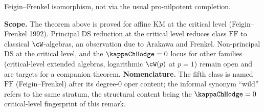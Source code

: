 \begin{remark}
\begin{enumerate}[label=\textup{(\roman*)}]
Feigin--Frenkel isomorphism, not via the usual pro-nilpotent
completion.
\end{enumerate}
\textbf{Scope.} The theorem above is proved for affine KM at the
critical level (Feigin--Frenkel 1992). Principal DS reduction at the
critical level reduces class $\mathrm{FF}$ to classical
$\cW$-algebras, an observation due to Arakawa and Frenkel. Non-principal
DS at the critical level, and the $\kappaChHodge=0$ locus for
other families (critical-level extended algebras, logarithmic
$\cW(p)$ at $p=1$) remain open and are targets for a companion
theorem.
\textbf{Nomenclature.} The fifth class is named $\mathrm{FF}$
(Feigin--Frenkel) after its degree-$0$ oper content; the informal
synonym ``wild'' refers to the same stratum, the structural content
being the $\kappaChHodge=0$ critical-level fingerprint of this remark.
\end{remark}

